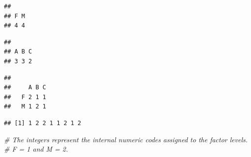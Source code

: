 \documentclass[
]{article}
\newenvironment{Shaded}{\begin{snugshade}}{\end{snugshade}}
\newcommand{\CommentTok}[1]{\textcolor[rgb]{0.56,0.35,0.01}{\textit{#1}}}
\newcommand{\FunctionTok}[1]{\textcolor[rgb]{0.13,0.29,0.53}{\textbf{#1}}}
\newcommand{\NormalTok}[1]{#1}
\newcommand{\SpecialCharTok}[1]{\textcolor[rgb]{0.81,0.36,0.00}{\textbf{#1}}}
\begin{document}
\begin{verbatim}
## 
## F M 
## 4 4
\end{verbatim}

\begin{Shaded}
\end{Shaded}

\begin{verbatim}
## 
## A B C 
## 3 3 2
\end{verbatim}

\begin{Shaded}
\end{Shaded}

\begin{verbatim}
##    
##     A B C
##   F 2 1 1
##   M 1 2 1
\end{verbatim}

\begin{Shaded}
\end{Shaded}

\begin{verbatim}
## [1] 1 2 2 1 1 2 1 2
\end{verbatim}

\begin{Shaded}
\begin{Highlighting}[]
\CommentTok{\# The integers represent the internal numeric codes assigned to the factor levels.}
\CommentTok{\# F = 1 and M = 2.}
\end{Highlighting}
\end{Shaded}
\end{document}
